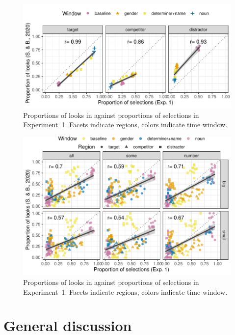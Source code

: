 \documentclass[10pt,letterpaper]{article}
\newcommand{\expref}[1]{Experiment~#1}
\begin{document}
\begin{figure}[H]
\centering
\includegraphics[width=\columnwidth]{../../analysis/SunBreheny/main/graphs/correlations}
\caption{Proportions of looks in  against proportions of selections in \expref{1}. Facets indicate regions, colors indicate time window.} 
\label{fig:results-correlations}
\end{figure}

\begin{figure}[H]
\centering
\includegraphics[width=\columnwidth]{../../analysis/SunBreheny/main/graphs/correlations-bycondition}
\caption{Proportions of looks in  against proportions of selections in \expref{1}. Facets indicate regions, colors indicate time window.} 
\label{fig:results-correlations}
\end{figure}

\section{General discussion}
\end{document}
